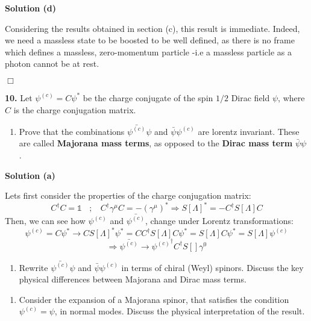 \documentclass[12pt]{article}
\newcommand{\qedwhite}{\hfill \ensuremath{\Box}}
\begin{document}
\color{blue}

\textbf{Solution (d)}

Considering the results obtained in section (c), this result is immediate. Indeed, we need a massless state to be boosted to be well defined, as there is no frame which defines a massless, zero-momentum particle -i.e a massless particle as a photon cannot be at rest.

\qedwhite

\color{black}

\textbf{10.} Let $\psi^{(c)} = C\psi^*$ be the charge conjugate of the spin $1/2$ Dirac field $\psi$, where $C$ is the charge conjugation matrix.
\begin{enumerate}[label=(\alph*), start = 1]
    \item Prove that the combinations $\bar{\psi^{(c)}}\psi$ and $\bar{\psi}\psi^{(c)}$ are lorentz invariant. These are called \textbf{Majorana mass terms}, as opposed to the \textbf{Dirac mass term} $\bar{\psi}\psi$.
\end{enumerate}

\color{blue}

\textbf{Solution (a)}

Lets first consider the properties of the charge conjugation matrix:
\[
    C^\dagger C = \mathbb{1} ~~~~;~~~~ C^\dagger \gamma^\mu C = -(\gamma^\mu)^* \Longrightarrow S[\Lambda]^* = -C^\dagger S[\Lambda] C
\]
Then, we can see how $\psi^{(c)}$ and $\bar{\psi^{(c)}}$, change under Lorentz transformations:
\[
    \psi^{(c)}=C\psi^* \longrightarrow  C S[\Lambda]^*\psi^* = C C^\dagger S[\Lambda] C\psi^* = S[\Lambda]C\psi^*= S[\Lambda]\psi^{(c)}
\]
\[
    \Longrightarrow \bar{\psi^{(c)}} \longrightarrow {\psi^{(c)}}^\dagger C^\dagger S[]\gamma^0
\]

\color{black}

\begin{enumerate}[label=(\alph*), start = 2]
    \item Rewrite $\bar{\psi^{(c)}}\psi$ and $\bar{\psi}\psi^{(c)}$ in terms of chiral (Weyl) spinors. Discuss the key physical differences between Majorana and Dirac mass terms.
\end{enumerate}
\begin{enumerate}[label=(\alph*), start = 3]
    \item Consider the expansion of a Majorana spinor, that satisfies the condition $\psi^{(c)} = \psi$, in normal modes. Discuss the physical interpretation of the result.
\end{enumerate}
\end{document}
